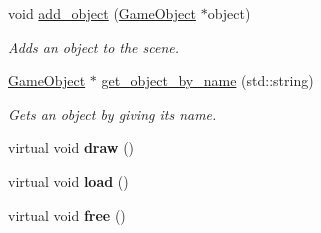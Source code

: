 \begin{DoxyCompactItemize}
\item 
void \hyperlink{classengine_1_1_scene_a1d7c1960d764159416a5eb332d0d2203}{add\+\_\+object} (\hyperlink{classengine_1_1_game_object}{Game\+Object} $\ast$object)
\begin{DoxyCompactList}\small\item\em Adds an object to the scene. \end{DoxyCompactList}\item 
\hyperlink{classengine_1_1_game_object}{Game\+Object} $\ast$ \hyperlink{classengine_1_1_scene_a565ca4778b3c81ac6b3434820d0a4cfa}{get\+\_\+object\+\_\+by\+\_\+name} (std\+::string)
\begin{DoxyCompactList}\small\item\em Gets an object by giving its name. \end{DoxyCompactList}\item 
virtual void {\bfseries draw} ()\hypertarget{classengine_1_1_scene_a257bc5515bb3e5af364fee377c431271}{}\label{classengine_1_1_scene_a257bc5515bb3e5af364fee377c431271}

\item 
virtual void {\bfseries load} ()\hypertarget{classengine_1_1_scene_a1e46b23b6ef624d2b1107804085a9c96}{}\label{classengine_1_1_scene_a1e46b23b6ef624d2b1107804085a9c96}

\item 
virtual void {\bfseries free} ()\hypertarget{classengine_1_1_scene_a9ca5afc4c001e68939b61b4671e240fa}{}\label{classengine_1_1_scene_a9ca5afc4c001e68939b61b4671e240fa}


\end{DoxyCompactItemize}
